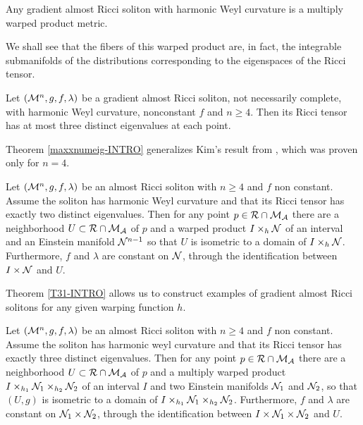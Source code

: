         \begin{teorema}\label{decompwarp-INTRO}
            Any gradient almost Ricci soliton with harmonic Weyl curvature is a multiply warped product metric.
            \end{teorema}

            We shall see that the fibers of this warped product are, in fact, the integrable submanifolds of the distributions corresponding to the eigenspaces of the Ricci tensor.

            \begin{teorema}\label{maxxnumeig-INTRO}
                Let $(\mathcal{M}^n,g,f,\lambda)$ be a gradient almost Ricci soliton, not necessarily complete, with harmonic Weyl curvature, nonconstant $f$ and $n\geq4$. Then its Ricci tensor has at most three distinct eigenvalues at each point.
            \end{teorema}

            Theorem \cref{maxxnumeig-INTRO} generalizes Kim's result from , which was proven only for $n = 4$.


            \begin{teorema}\label{T31-INTRO}
                Let $\left(\mathcal{M}^n, g, f, \lambda\right)$ be an almost Ricci soliton with $n \geq 4$ and $f$ non constant. Assume the soliton has harmonic Weyl curvature and that its Ricci tensor has exactly two distinct eigenvalues. Then for any point $p\in\mathcal{R}\cap \mathcal{M}_{\mathcal{A}}$ there are a neighborhood $U\subset\mathcal{R}\cap \mathcal{M}_{\mathcal{A}}$ of $p$ and a warped product $I \times_{h} \mathcal{N}$ of an interval and an Einstein manifold $\mathcal{N}^{n-1}$ so that $U$ is isometric to a domain of $I \times_{h} \mathcal{N}$. Furthermore, $f$ and $\lambda$ are constant on $\mathcal{N}$, through the identification between $I \times \mathcal{N}$ and $U$.
           \end{teorema}
           
           Theorem \cref{T31-INTRO} allows us to construct examples of gradient almost Ricci solitons for any given warping function $h$. 
           
           
           \begin{teorema}\label{localstrucDuplo-INTRO}
               Let $\left(\mathcal{M}^n, g, f, \lambda\right)$ be an almost Ricci soliton with $n \geq 4$ and $f$ non constant. Assume the soliton has harmonic weyl curvature and that its Ricci tensor has exactly three distinct eigenvalues. Then for any point $p\in\mathcal{R}\cap \mathcal{M}_{\mathcal{A}}$ there are a neighborhood $U\subset\mathcal{R}\cap \mathcal{M}_{\mathcal{A}}$ of $p$ and a multiply warped product $I \times_{h_1} \mathcal{N}_1 \times_{h_2} \mathcal{N}_2$ of an interval $I$ and two Einstein manifolds $\mathcal{N}_1$ and $\mathcal{N}_2$, so that $(U,g)$ is isometric to a domain of $I \times_{h_1} \mathcal{N}_1 \times_{h_2} \mathcal{N}_2$. Furthermore, $f$ and $\lambda$ are constant on $\mathcal{N}_{1}\times\mathcal{N}_{2}$, through the identification between $I\times\mathcal{N}_{1}\times\mathcal{N}_{2}$ and $U$.
               \end{teorema}


